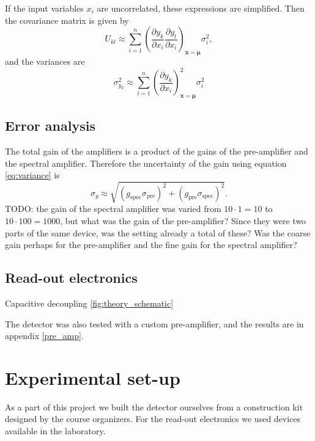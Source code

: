 \documentclass[a4paper]{article}
\newenvironment{todo}{
\color{red}
}
{
}
\begin{document}
If the input variables $x_i$ are uncorrelated, these expressions are simplified.
Then the covariance matrix is given by
\begin{equation}
U_{kl} \approx \sum_{i=1}^n \left( \frac{\partial y_k}{\partial x_i} \frac{\partial y_l}{\partial x_i} \right)_{\mathbf{x}=\mathbf{\mu}} \sigma_i^2,
\end{equation}
and the variances are
\begin{equation}
\sigma_{y_k}^2 \approx \sum_{i=1}^n \left( \frac{\partial y_k}{\partial x_i} \right)_{\mathbf{x}=\mathbf{\mu}}^2 \sigma_i^2
\label{eq:variance}
\end{equation}
\cite[p. 20--22]{cowan_statistical_1998}


\subsection{Error analysis}
\begin{todo}
The total gain of the amplifiers is a product of the gains of the pre-amplifier and the spectral amplifier.
Therefore the uncertainty of the gain using equation \ref{eq:variance} is
\begin{equation}
\sigma_g \approx \sqrt{(g_\text{spec} \sigma_\text{pre})^2 + (g_\text{pre}\sigma_\text{spec})^2}.
\end{equation}
TODO: the gain of the spectral amplifier was varied from $10\cdot1=10$ to $10\cdot100=1000$, but what was the gain of the pre-amplifier?
Since they were two parts of the same device, was the setting already a total of these?
Was the coarse gain perhaps for the pre-amplifier and the fine gain for the spectral amplifier?
\end{todo}


\subsection{Read-out electronics}
\label{electronics}


Capacitive decoupling \ref{fig:theory_schematic}

The detector was also tested with a custom pre-amplifier, and the results are in appendix \ref{pre_amp}.


\clearpage
\section{Experimental set-up}
\label{setup}
As a part of this project we built the detector ourselves from a construction kit designed by the course organizers.
For the read-out electronics we used devices available in the laboratory.
\end{document}
